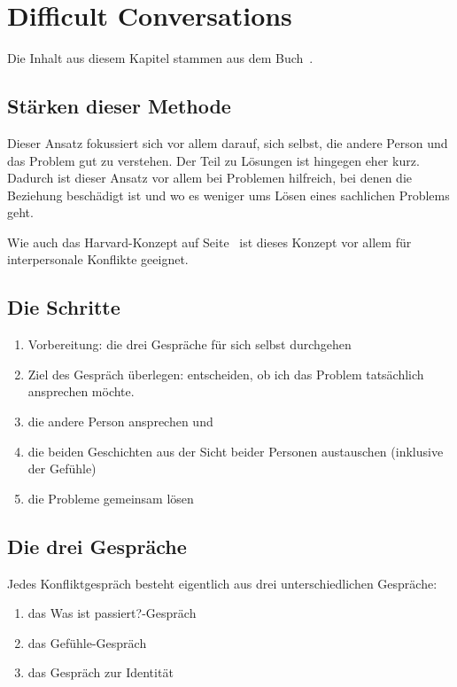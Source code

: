 \section{Difficult Conversations}

Die Inhalt aus diesem Kapitel stammen aus dem Buch~\cite{difficult-conversations}.


\subsection{Stärken dieser Methode}

Dieser Ansatz fokussiert sich vor allem darauf, sich selbst, die andere Person und das Problem gut zu verstehen. Der Teil zu Lösungen ist hingegen eher kurz. Dadurch ist dieser Ansatz vor allem bei Problemen hilfreich, bei denen die Beziehung beschädigt ist und wo es weniger ums Lösen eines sachlichen Problems geht.

Wie auch das Harvard-Konzept auf Seite~\pageref{harvard-konzept} ist dieses Konzept vor allem für interpersonale Konflikte geeignet.


\subsection{Die Schritte}

\begin{enumerate}
  \item Vorbereitung: die drei Gespräche für sich selbst durchgehen
  \item Ziel des Gespräch überlegen: entscheiden, ob ich das Problem tatsächlich ansprechen möchte.
  \item die andere Person ansprechen und 
  \item die beiden Geschichten aus der Sicht beider Personen austauschen (inklusive der Gefühle)
  \item die Probleme gemeinsam lösen
\end{enumerate}


\subsection{Die drei Gespräche}

Jedes Konfliktgespräch besteht eigentlich aus drei unterschiedlichen Gespräche:

\begin{enumerate}
  \item das \glqq Was ist passiert?\grqq-Gespräch
  \item das Gefühle-Gespräch
  \item das Gespräch zur Identität
\end{enumerate}


